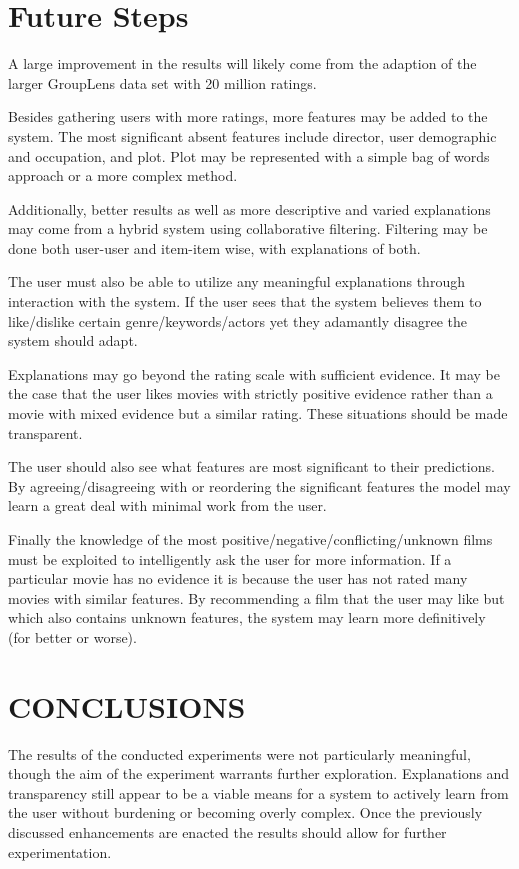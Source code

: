 \documentclass[letterpaper, 10 pt, conference]{ieeeconf}  %
\begin{document}
\section{Future Steps}
A large improvement in the results will likely come from the adaption of the larger GroupLens data set with 20 million ratings.

Besides gathering users with more ratings, more features may be added to the system. The most significant absent features include director, user demographic and occupation, and plot. Plot may be represented with a simple bag of words approach or a more complex method.

Additionally, better results as well as more descriptive and varied explanations may come from a hybrid system using collaborative filtering. Filtering may be done both user-user and item-item wise, with explanations of both.

The user must also be able to utilize any meaningful explanations through interaction with the system. If the user sees that the system believes them to like/dislike certain genre/keywords/actors yet they adamantly disagree the system should adapt.

Explanations may go beyond the rating scale with sufficient evidence. It may be the case that the user likes movies with strictly positive evidence rather than a movie with mixed evidence but a similar rating. These situations should be made transparent.

The user should also see what features are most significant to their predictions. By agreeing/disagreeing with or reordering the significant features the model may learn a great deal with minimal work from the user.

Finally the knowledge of the most positive/negative/conflicting/unknown films must be exploited to intelligently ask the user for more information. If a particular movie has no evidence it is because the user has not rated many movies with similar features. By recommending a film that the user may like but which also contains unknown features, the system may learn more definitively (for better or worse).



\section{CONCLUSIONS}

The results of the conducted experiments were not particularly meaningful, though the aim of the experiment warrants further exploration. Explanations and transparency still appear to be a viable means for a system to actively learn from the user without burdening or becoming overly complex. Once the previously discussed enhancements are enacted the results should allow for further experimentation.
\end{document}
